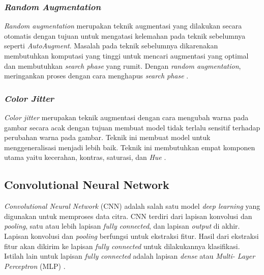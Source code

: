 \subsubsection{\textit{Random Augmentation}} \label{II.Teori3.4}
\textit{Random augmentation} merupakan teknik augmentasi yang dilakukan 
secara otomatis dengan tujuan untuk mengatasi kelemahan pada teknik 
sebelumnya seperti \textit{AutoAugment}. Masalah pada teknik sebelumnya 
dikarenakan membutuhkan komputasi yang tinggi untuk mencari augmentasi 
yang optimal dan membutuhkan \textit{search phase} yang rumit. Dengan 
\textit{random augmentation}, meringankan proses dengan cara menghapus 
\textit{search phase} \cite{cubuk2019randaugmentpracticalautomateddata}.

\subsubsection{\textit{Color Jitter}} \label{II.Teori3.5}
\textit{Color jitter} merupakan teknik augmentasi dengan cara mengubah 
warna pada gambar secara acak dengan tujuan membuat model tidak terlalu 
sensitif terhadap perubahan warna pada gambar. Teknik ini membuat model 
untuk menggeneralisasi menjadi lebih baik. Teknik ini membutuhkan empat 
komponen utama yaitu kecerahan, kontras, saturasi, dan \textit{Hue} \cite{zhang2023dive}.


\subsection{Convolutional Neural Network} \label{II.Teori4}
\textit{Convolutional Neural Network} (CNN) adalah salah satu model 
\textit{deep learning} yang digunakan untuk memproses data citra. CNN 
terdiri dari lapisan konvolusi dan \textit{pooling}, satu atau lebih 
lapisan \textit{fully connected}, dan lapisan \textit{output} di akhir. 
Lapisan konvolusi dan \textit{pooling} berfungsi untuk ekstraksi fitur. 
Hasil dari ekstraksi fitur akan dikirim ke lapisan \textit{fully connected} 
untuk dilakukannya klasifikasi. Istilah lain untuk lapisan 
\textit{fully connected} adalah lapisan \textit{dense} atau \textit{Multi-
Layer Perceptron} (MLP) \cite{726791}. \par


